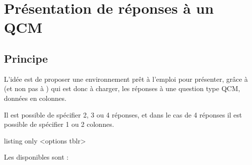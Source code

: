 \documentclass[french,11pt,a4paper]{article}
\begin{document}
\newpage

\section{Présentation de réponses à un QCM}

\subsection{Principe}

L'idée est de proposer une environnement prêt à l'emploi pour présenter, grâce à  (et non pas à ) qui est donc à charger, les réponses à une question type QCM, données en colonnes.

\smallskip

Il est possible de spécifier 2, 3 ou 4 réponses, et dans le cas de 4 réponses il est possible de spécifier 1 ou 2 colonnes.

\begin{DemoCode}{listing only}
<options tblr>
\end{DemoCode}

Les  disponibles sont :
\end{document}
